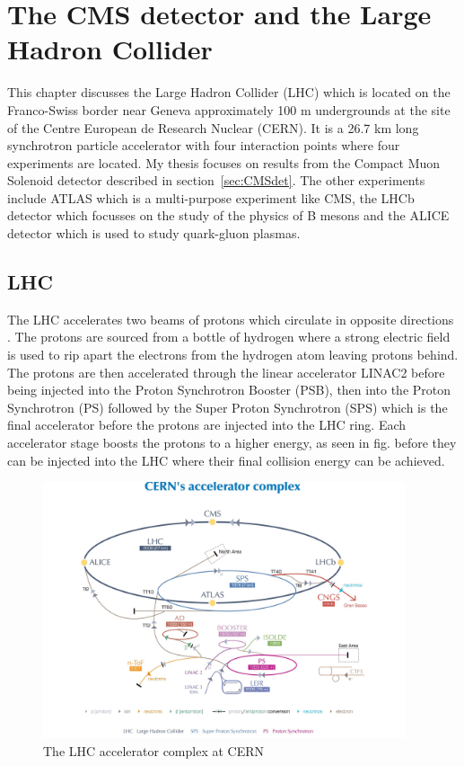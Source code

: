 \chapter{The CMS detector and the Large Hadron Collider}
\label{c:det}
This chapter discusses the Large Hadron Collider (LHC) which is located on the Franco-Swiss border near Geneva approximately 100 m undergrounds at the site of the Centre European de Research Nuclear (CERN). It is a 26.7 km long synchrotron particle accelerator with four interaction points where four experiments are located.  My thesis focuses on results from the Compact Muon Solenoid detector described in section~\ref{sec:CMSdet}. The other experiments include ATLAS which is a multi-purpose experiment like CMS, the LHCb detector which focusses on the study of the physics of B mesons and the ALICE detector which is used to study quark-gluon plasmas.

\section{LHC}

The LHC accelerates two beams of protons which circulate in opposite directions . The protons are sourced from a bottle of hydrogen where a strong electric field is used to rip apart the electrons from the hydrogen atom leaving protons behind. The protons are then accelerated through the linear accelerator LINAC2 before being injected into the Proton Synchrotron Booster (PSB), then into the Proton Synchrotron (PS) followed by the Super Proton Synchrotron (SPS) which is the final accelerator before the protons are injected into the LHC ring. Each accelerator stage boosts the protons to a higher energy, as seen in fig. before they can be injected into the LHC where their final collision energy can be achieved.

\begin{figure}[ht!]
\centering
    \includegraphics[width=0.95\textwidth]{images/LHCacc.jpg}
    \caption{The LHC accelerator complex at CERN}
    \label{fig:LHC acc}
\end{figure}


